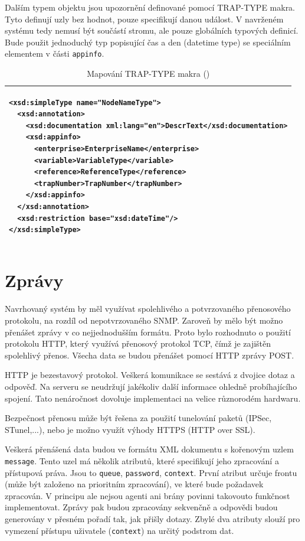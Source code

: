 Dalším typem objektu jsou upozornění definované pomocí TRAP-TYPE makra. Tyto definují uzly bez hodnot, pouze specifikují danou událost. V navrženém systému
tedy nemusí být součástí stromu, ale pouze globálních typových definicí. Bude použit jednoduchý typ popisující čas a den (datetime type) se speciálním elementem
v části \verb|appinfo|.

\begin{table}
	\centering
	{\footnotesize
	  \begin{tabular}{|p{15cm}|}
      \hline
\begin{verbatim}<xsd:simpleType name="NodeNameType">
  <xsd:annotation>
    <xsd:documentation xml:lang="en">DescrText</xsd:documentation>
    <xsd:appinfo>
      <enterprise>EnterpriseName</enterprise>
      <variable>VariableType</variable>
      <reference>ReferenceType</reference>
      <trapNumber>TrapNumber</trapNumber>
    </xsd:appinfo>
  </xsd:annotation>
  <xsd:restriction base="xsd:dateTime"/>
</xsd:simpleType>\end{verbatim}\\
      \hline
    \end{tabular}
  }
	\caption{Mapování TRAP-TYPE makra (\cite{macejko_dipl})}
	\label{tab_xml_trap_type}
\end{table}

\newpage

\section{Zprávy}
Navrhovaný systém by měl využívat spolehlivého a potvrzovaného přenosového protokolu, na rozdíl od nepotvrzovaného SNMP. Zaroveň by mělo být možno
přenášet zprávy v co nejjednodušším formátu. Proto bylo rozhodnuto o použití protokolu HTTP, který využívá přenosový protokol TCP, čímž je zajištěn 
spolehlivý přenos. Všecha data se budou přenášet pomocí HTTP zprávy POST.

HTTP je bezestavový protokol. Veškerá komunikace se sestává z dvojice dotaz a odpověď. Na serveru se neudržují jakékoliv další informace ohledně probíhajícího
spojení. Tato nenáročnost dovoluje implementaci na velice různorodém hardwaru.

Bezpečnost přenosu může být řešena za použití tunelování paketů (IPSec, STunel,...), nebo je možno využít výhody HTTPS (HTTP over SSL). 

Veškerá přenášená data budou ve formátu XML dokumentu s kořenovým uzlem \verb|message|. Tento uzel má několik atributů, které specifikují jeho zpracování a přístupová
práva. Jsou to \verb|queue|, \verb|password|, \verb|context|. První atribut určuje frontu (může být založeno na prioritním zpracování), ve které bude požadavek zpracován.
V principu ale nejsou agenti ani brány povinni takovouto funkčnost implementovat. Zprávy pak budou zpracovány sekvenčně a odpovědi budou generovány v přesném pořadí tak, 
jak přišly dotazy. Zbylé dva atributy slouží pro vymezení přístupu uživatele (\verb|context|) na určitý podstrom dat. 

